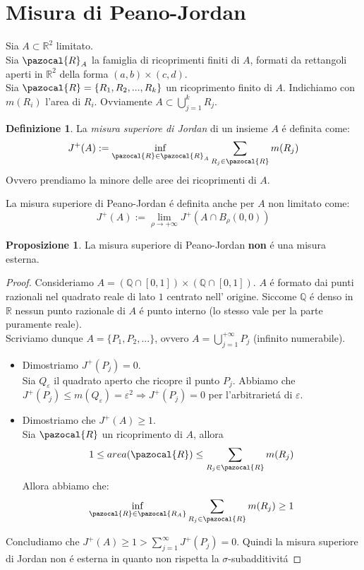\documentclass[11pt,a4paper]{report}
\theoremstyle{plain}
\theoremstyle{definition}
\newtheorem{defn}[thm]{Definizione} %
\newtheorem{prop}[thm]{Proposizione} %
\begin{document}
\section{Misura di Peano-Jordan}
Sia $A \subset \mathbb{R}^2$ limitato.\\
Sia $\pazocal{R}_A$ la famiglia di ricoprimenti finiti di $A$, formati da rettangoli aperti in $\mathbb{R}^2$ della forma $(a,b)\times(c,d)$.\\
Sia $\pazocal{R} = \{R_1, R_2, ... , R_k\}$ un ricoprimento finito di $A$. Indichiamo con $m(R_i)$ l'area di $R_i$. Ovviamente $A \subset \bigcup\limits_{j=1}^{k}R_j$.

\begin{defn}
	La \textit{misura superiore di Jordan} di un insieme $A$ \'e definita come:
	\[
		J^+(A) := \inf\limits_{\pazocal{R} \in \pazocal{R}_A} \sum\limits_{R_j \in \pazocal{R}} m(R_j)
	\]
	Ovvero prendiamo la minore delle aree dei ricoprimenti di $A$.
\end{defn}
La misura superiore di Peano-Jordan \'e definita anche per $A$ non limitato come:
\[
		J^+(A) := \lim\limits_{\rho \rightarrow +\infty} J^+(A \cap B_\rho(0,0))
	\]
\begin{prop}
La misura superiore di Peano-Jordan \textbf{non} \'e una misura esterna.
\begin{proof}
Consideriamo $A = (\mathbb{Q}\cap [0,1])\times(\mathbb{Q}\cap [0,1])$. $A$ \'e formato dai punti razionali nel quadrato reale di lato $1$ centrato nell' origine. Siccome $\mathbb{Q}$ \'e denso in $\mathbb{R}$ nessun punto razionale di $A$ \'e punto interno (lo stesso vale per la parte puramente reale).\\
Scriviamo dunque $A = \{P_1,P_2,...\}$, ovvero $A = \bigcup\limits_{j=1}^{+\infty}P_j$ (infinito numerabile).\\
\begin{itemize}
\item Dimostriamo $J^+({P_j}) = 0$.\\ Sia $Q_\varepsilon$ il quadrato aperto che ricopre il punto $P_j$. Abbiamo che $J^+({P_j}) \le m(Q_\varepsilon) = \varepsilon^2 \Rightarrow J^+({P_j}) = 0$ per l'arbitrariet\'a di $\varepsilon$.\\
\item Dimostriamo che $J^+(A) \ge 1$.\\
Sia $\pazocal{R}$ un ricoprimento di $A$, allora
\[
	1 \le area(\pazocal{R}) \le \sum\limits_{R_j \in \pazocal{R}}m(R_j)
\]
Allora abbiamo che:
\[
	\inf\limits_{\pazocal{R}\in\pazocal{R_A}} \sum\limits_{R_j \in \pazocal{R}}m(R_j) \ge 1
\]
\end{itemize}
Concludiamo che $J^+(A) \ge 1 > \sum\limits_{j=1}^{\infty}J^+({P_j}) = 0$. Quindi la misura superiore di Jordan non \'e esterna in quanto non rispetta la $\sigma$-subadditivit\'a
\end{proof}
\end{prop}
\end{document}
